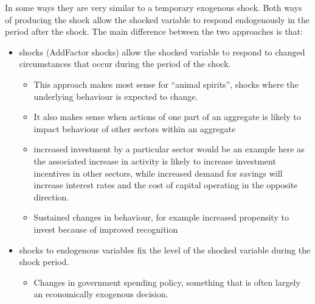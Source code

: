 \documentclass[letterpaper,10pt,english]{jupyterBook}
\begin{document}
\sphinxAtStartPar
In some ways they are very similar to a temporary exogenous shock. Both ways of producing the shock allow the shocked variable to respond endogenously in the period after the shock.  The main difference between the two approaches is that:
\begin{itemize}
\item {} 
\sphinxAtStartPar
{} shocks (Add\sphinxhyphen{}Factor shocks) allow the shocked variable to respond to changed circumstances that occur during the period of the shock.
\begin{itemize}
\item {} 
\sphinxAtStartPar
This approach makes most sense for “animal spirits”, shocks where the underlying behaviour is expected to change.

\item {} 
\sphinxAtStartPar
It also makes sense when actions of one part of an aggregate is likely to impact behaviour of other sectors within an aggregate

\item {} 
\sphinxAtStartPar
increased investment by a particular sector would be an example here as the associated increase in activity is likely to increase investment incentives in other sectors, while increased demand for savings will increase interest rates and the cost of capital operating in the opposite direction.

\item {} 
\sphinxAtStartPar
Sustained changes in behaviour, for example increased propensity to invest because of improved recognition

\end{itemize}

\item {} 
\sphinxAtStartPar
{} shocks to endogenous variables fix the level of the shocked variable during the shock period.
\begin{itemize}
\item {} 
\sphinxAtStartPar
Changes in government spending policy, something that is often largely an economically exogenous decision.

\end{itemize}

\end{itemize}
\end{document}
